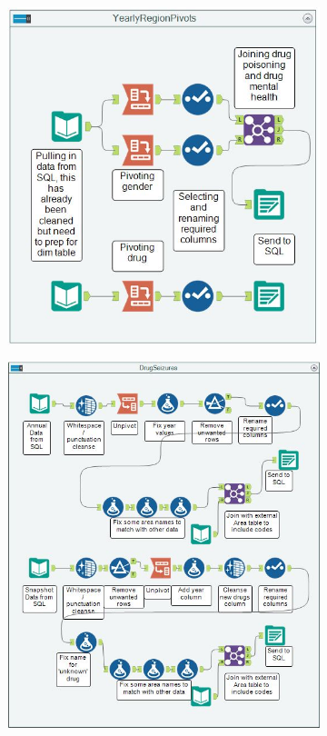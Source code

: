 \documentclass{article}
\begin{document}
\begin{itemize}
\begin{figure}
\begin{subfigure}[t]{0.5\linewidth}
			\includegraphics[width=\linewidth]{images/Alteryx_YearlyRegion.JPG}
		\end{subfigure}
		\begin{subfigure}[t]{0.5\linewidth}
  			\centering
			\includegraphics[width=\linewidth]{images/Alteryx_DrugSeizures.JPG}

\end{subfigure}
\end{figure}
\end{itemize}
\end{document}
